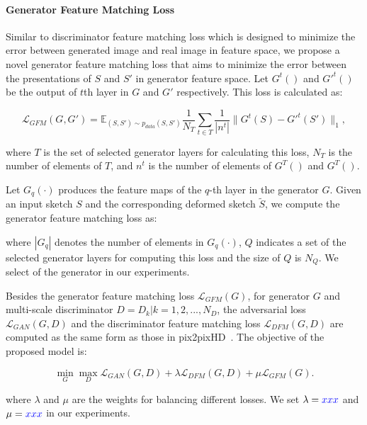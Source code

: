 \paragraph{Generator Feature Matching Loss}
Similar to discriminator feature matching loss which is designed to minimize the error between generated image and real image in feature space, we propose a novel generator feature matching loss that aims to minimize the error between the presentations of $S$ and $S'$ in generator feature space. Let $G^t()$ and $G'^t()$ be the output of $t$th layer in $G$ and $G'$ respectively. This loss is calculated as:

\begin{equation}
\label{eqn:loss_GFM}
\mathcal{L}_{GFM}(G, G')=\mathbb{E}_{(S, S')\sim p_{data}(S, S')} \frac{1}{N_T} \sum_{t\in T}  \frac{1}{|n^t|} \|G^t(S)-G'^t(S') \|_1,
\end{equation}

where $T$ is the set of selected generator layers for calculating this loss, $N_T$ is the number of elements of $T$, and $n^t$ is the number of elements of $G^T()$ and $G^T()$.

Let $G_q(\cdot)$ produces the feature maps of the $q$-th layer in the generator $G$.
%
Given an input sketch $S$ and the corresponding deformed sketch $\tilde{S}$, we compute the generator feature matching loss as:


%
where $|G_q|$ denotes the number of elements in $G_q(\cdot)$, $Q$ indicates a set of the selected generator layers for computing this loss and the size of $Q$ is $N_Q$. 
We select  of the generator in our experiments.

Besides the generator feature matching loss $\mathcal{L}_{GFM}(G)$, for generator $G$ and multi-scale discriminator $D={D_k | k=1,2,...,N_D}$, the adversarial loss $\mathcal{L}_{GAN}(G, D)$ and the discriminator feature matching loss $\mathcal{L}_{DFM}(G, D)$ are computed as the same form as those in pix2pixHD~\cite{pix2pixHD}. 
%
The objective of the proposed model is:

\begin{equation}
	\label{eqn:new_minmax_game}
	\min_G \max_{D} \mathcal{L}_{GAN}(G, D)+\lambda \mathcal{L}_{DFM}(G, D) +\mu \mathcal{L}_{GFM}(G).
\end{equation}

where $\lambda$ and $\mu$ are the weights for balancing different losses. We set $\lambda=\textcolor{blue}{xxx}$ and $\mu=\textcolor{blue}{xxx}$ in our experiments.